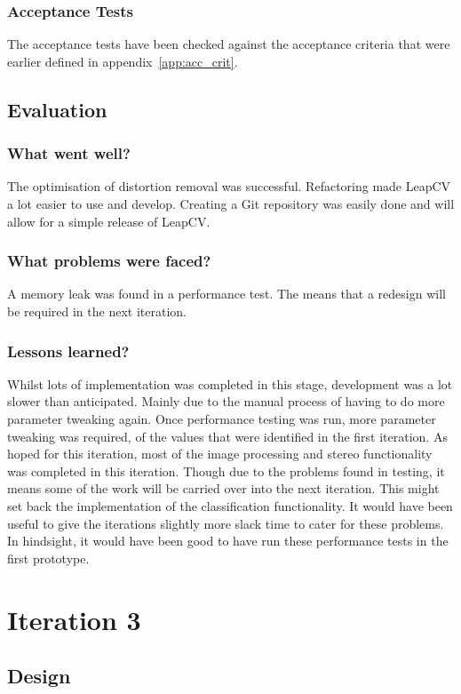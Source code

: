 \documentclass[11pt,oneside]{report}
\begin{document}
			\subsubsection{Acceptance Tests}
			The acceptance tests have been checked against the acceptance criteria that were earlier defined in appendix~\ref{app:acc_crit}.
			
		\subsection{Evaluation}
			\subsubsection{What went well?}
			The optimisation of distortion removal was successful.
			Refactoring made LeapCV a lot easier to use and develop.
			Creating a Git repository was easily done and will allow for a simple release of LeapCV.
			\subsubsection{What problems were faced?}
			A memory leak was found in a performance test.
			The means that a redesign will be required in the next iteration.
			\subsubsection{Lessons learned?}
			Whilst lots of implementation was completed in this stage, development was a lot slower than anticipated.
			Mainly due to the manual process of having to do more parameter tweaking again.
			Once performance testing was run, more parameter tweaking was required, of the values that were identified in the first iteration.
			As hoped for this iteration, most of the image processing and stereo functionality was completed in this iteration.
			Though due to the problems found in testing, it means some of the work will be carried over into the next iteration.
			This might set back the implementation of the classification functionality.
			It would have been useful to give the iterations slightly more slack time to cater for these problems.
			In hindsight, it would have been good to have run these performance tests in the first prototype.
	\section{Iteration 3}\label{sec:p3}
		\subsection{Design}
\end{document}
